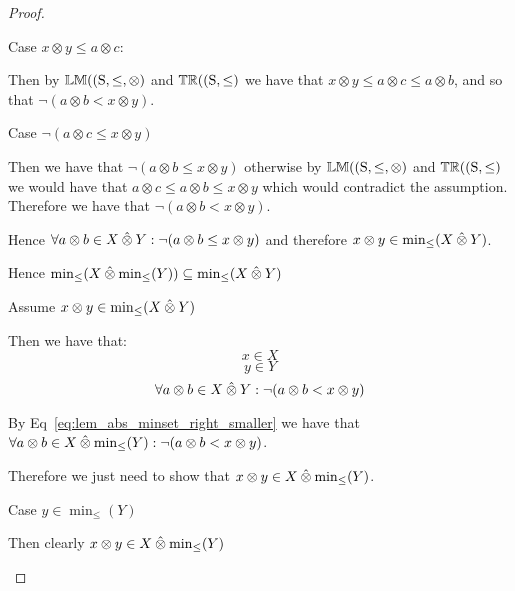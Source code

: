 \documentclass[../Summary.tex]{subfiles}
\begin{document}
\begin{proof}
\begin{ind}
\begin{ind}
\begin{ind}
Case $x \otimes y \leq a \otimes c$:
\begin{ind}
Then by ${\mathbb{LM}}(\mathrm{(S,\leq,\otimes)}$ and ${\mathbb{TR}}(\mathrm{(S,\leq)}$ we have that $x \otimes y \leq a \otimes c \leq a \otimes b$, and so that $\neg (a \otimes b < x \otimes y)$.
\end{ind}
Case $\neg (a \otimes c \leq x \otimes y)$
\begin{ind}
Then we have that $\neg(a \otimes b \leq x \otimes y)$ otherwise by ${\mathbb{LM}}(\mathrm{(S,\leq,\otimes)}$ and ${\mathbb{TR}}(\mathrm{(S,\leq)}$ we would have that $a \otimes c \leq a \otimes b \leq x \otimes y$ which would contradict the assumption. Therefore we have that $\neg (a \otimes b < x \otimes y)$.
\end{ind}
\end{ind}
\end{ind}
Hence $\forall a \otimes b \in X \mathbin{\hat{\otimes}} Y : \neg (a \otimes b \leq x \otimes y)$ and therefore $x \otimes y \in \min_\leq(X \mathbin{\hat{\otimes}} Y)$.

\end{ind}
Hence $ \min_\leq(X \mathbin{\hat{\otimes}} \min_\leq(Y)) \subseteq \min_\leq(X \mathbin{\hat{\otimes}} Y)$

\vspace{2em}

Assume $x \otimes y \in \min_\leq(X \mathbin{\hat{\otimes}} Y)$
\begin{ind}
Then we have that:
\begin{equation}
x \in X
\end{equation}
\begin{equation}
y \in Y
\end{equation}
\begin{equation} \label{eq:lem_abs_minset_right_smaller}
\forall a \otimes b \in X \mathbin{\hat{\otimes}} Y : \neg (a \otimes b < x \otimes y)
\end{equation}

By Eq~\ref{eq:lem_abs_minset_right_smaller} we have that $\forall a \otimes b \in X \mathbin{\hat{\otimes}} \min_\leq(Y) : \neg (a \otimes b < x \otimes y)$.

\vspace{0.5em}

Therefore we just need to show that $x \otimes y \in X \mathbin{\hat{\otimes}} \min_\leq(Y)$.

\vspace{0.5em}

Case $y \in \min_\leq(Y)$
\begin{ind}
Then clearly $x \otimes y \in X \mathbin{\hat{\otimes}} \min_\leq(Y)$
\end{ind}


\end{ind}
\end{proof}
\end{document}
